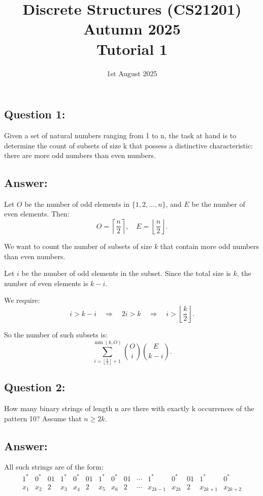 \documentclass{article}
\title{\large Discrete Structures (CS21201) Autumn 2025\\ \vspace{0.5em} \LARGE Tutorial 1}
\date{1st August 2025}
\begin{document}
\maketitle

\subsection*{Question 1:} Given a set of natural numbers ranging from 1 to n, the task at hand is to determine the count of subsets of size k that possess a distinctive characteristic: there are more odd numbers than even numbers.

\subsection*{Answer:}
Let $O$ be the number of odd elements in $\{1,2,\dots,n\}$, and $E$ be the number of even elements. Then:
\[
O = \left\lceil \frac{n}{2} \right\rceil, \quad E = \left\lfloor \frac{n}{2} \right\rfloor.
\]

We want to count the number of subsets of size $k$ that contain more odd numbers than even numbers.

Let $i$ be the number of odd elements in the subset. Since the total size is $k$, the number of even elements is $k - i$.

We require:
\[
i > k - i \quad \Rightarrow \quad 2i > k \quad \Rightarrow \quad i > \left\lfloor \frac{k}{2} \right\rfloor.
\]

So the number of such subsets is:
\[
\sum_{i = \left\lfloor \frac{k}{2} \right\rfloor + 1}^{\min(k, O)} \binom{O}{i} \binom{E}{k - i}.
\]

\subsection*{Question 2:} How many binary strings of length n are there with exactly k occurrences of the pattern 10? Assume that $n\ge 2k$. 

\subsection*{Answer:}
All such strings are of the form:
\[
\begin{array}{cccccccccccccccc}
1^{*} & 0^{*} & 01 & 1^{*} & 0^{*} & 01 & 1^{*} & 0^{*} & 01 & \cdots & 1^{*} & 0^{*} & 01 & 1^{*} & 0^{*} \\
x_1   & x_2   & 2  & x_3   & x_4   & 2  & x_5   & x_6   & 2  & \cdots & x_{2k-1} & x_{2k} & 2 & x_{2k+1} & x_{2k+2}
\end{array}
\]
\end{document}
